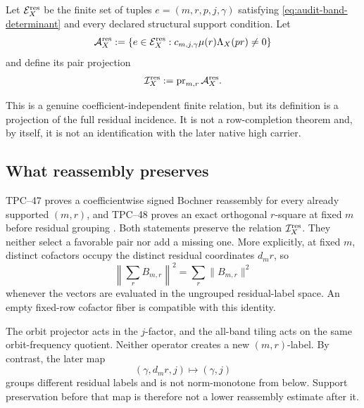 \begin{definition}
\label{def:audit-residual-incidences}
Let \(\mathcal E_X^{\rm res}\) be the finite set of tuples
\(e=(m,r,p,j,\gamma)\) satisfying
\eqref{eq:audit-band-determinant} and every declared structural support
condition.  Let
\begin{equation}
 \mathcal A_X^{\rm res}
 :=\{e\in\mathcal E_X^{\rm res}:
      c_{m,j,\gamma}\mu(r)\Lambda_X(pr)\ne0\}
 \label{eq:audit-active-residual-incidence}
\end{equation}
and define its pair projection
\begin{equation}
 \mathcal I_X^{\rm res}:=\operatorname{pr}_{m,r}\mathcal A_X^{\rm res}.
 \label{eq:audit-residual-pair-projection}
\end{equation}
\end{definition}

This is a genuine coefficient-independent finite relation, but its
definition is a projection of the full residual incidence.  It is not a
row-completion theorem and, by itself, it is not an identification with the
later native high carrier.

\subsection{What reassembly preserves}

TPC--47 proves a coefficientwise signed Bochner reassembly for every
already supported \((m,r)\), and TPC--48 proves an exact orthogonal
\(r\)-square at fixed \(m\) before residual grouping
\citep{WangTPC47,WangTPC48}.  Both statements preserve the relation
\(\mathcal I_X^{\rm res}\).  They neither select a favorable pair nor add a
missing one.  More explicitly, at fixed \(m\), distinct cofactors occupy
the distinct residual coordinates \(d_mr\), so
\begin{equation}
 \left\|\sum_r B_{m,r}\right\|^2
 =\sum_r\|B_{m,r}\|^2
 \label{eq:audit-fixed-row-r-square}
\end{equation}
whenever the vectors are evaluated in the ungrouped residual-label space.
An empty fixed-row cofactor fiber is compatible with this identity.

The orbit projector acts in the \(j\)-factor, and the all-band tiling acts
on the same orbit-frequency quotient.  Neither operator creates a new
\((m,r)\)-label.  By contrast, the later map
\begin{equation}
 (\gamma,d_mr,j)\longmapsto(\gamma,j)
 \label{eq:audit-residual-erasure}
\end{equation}
groups different residual labels and is not norm-monotone from below.
Support preservation before that map is therefore not a lower reassembly
estimate after it.

